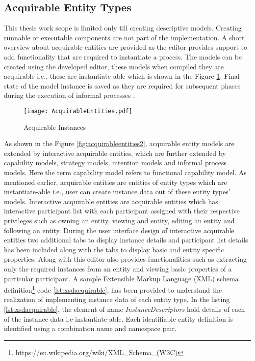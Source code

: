 \subsection{Acquirable Entity Types}
\label{sec:acquirableentities}
This thesis work scope is limited only till creating descriptive models. Creating runnable or executable components are not part of the implementation. A short overview about acquirable entities are provided as the editor provides support to add functionality that are required to instantiate a process. The models can be created using the developed editor, these models when compiled they are acquirable i.e., these are instantiate-able which is shown in the Figure \ref{fig:acquirableentities}. Final state of the model instance is saved as they are required for subsequent phases during the execution of informal processes \cite{Sungur2015}. 

\begin{figure}
	\centering
	\texttt{[image: AcquirableEntities.pdf]}
	\caption{Acquirable Instances}
	\label{fig:acquirableentities}
\end{figure}

As shown in the Figure \ref{fig:acquirableentities2}, acquirable entity models are extended by interactive acquirable entities, which are further extended by capability models, strategy models, intention models and informal process models. Here the term capability model refers to functional capability model. As mentioned earlier, acquirable entities are entities of entity types which are instantiate-able i.e., user can create instance data out of these entity types' models. Interactive acquirable entities are acquirable entities which has interactive participant list with each participant assigned with their respective privileges such as owning an entity, viewing and entity, editing an entity and following an entity. During the user interface design of interactive acquirable entities two additional tabs to display instance details and participant list details has been included along with the tabs to display basic and entity specific properties. Along with this editor also provides functionalities such as extracting only the required instances from an entity and viewing basic properties of a particular participant. A sample Extensible Markup Language (XML) schema definition\footnote{https://en.wikipedia.org/wiki/XML\_Schema\_(W3C)} code \ref{lst:xsdacquirable}, has been provided to understand the realization of implementing instance data of each entity type. In the listing \ref{lst:xsdacquirable}, the element of name \textit{InstanceDescriptors} hold details of each of the instance data i.e instantiate-able. Each identifiable entity definition is identified
using a combination name and namespace pair. 

